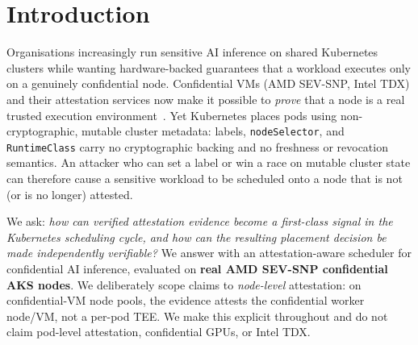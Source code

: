 \section{Introduction}
\label{sec:introduction}

Organisations increasingly run sensitive AI inference on shared Kubernetes
clusters while wanting hardware-backed guarantees that a workload executes only
on a genuinely confidential node. Confidential VMs (AMD SEV-SNP, Intel TDX) and
their attestation services now make it possible to \emph{prove} that a node is a
real trusted execution environment~\cite{misono2024cvms,cheng2023tdx}. Yet
Kubernetes places pods using non-cryptographic, mutable cluster metadata:
labels, \texttt{nodeSelector}, and \texttt{RuntimeClass} carry no cryptographic
backing and no freshness or revocation semantics. An attacker who can set a
label or win a race on mutable cluster state can therefore cause a sensitive
workload to be scheduled onto a node that is not (or is no longer) attested.

We ask: \emph{how can verified attestation evidence become a first-class signal
in the Kubernetes scheduling cycle, and how can the resulting placement decision
be made independently verifiable?} We answer with an attestation-aware scheduler
for confidential AI inference, evaluated on \textbf{real AMD SEV-SNP confidential
AKS nodes}. We deliberately scope claims to \emph{node-level} attestation: on
confidential-VM node pools, the evidence attests the confidential worker
node/VM, not a per-pod TEE. We make this explicit throughout and do not claim
pod-level attestation, confidential GPUs, or Intel TDX.

